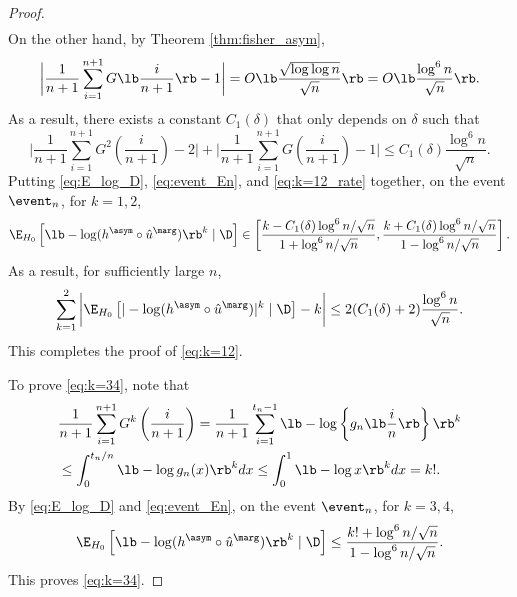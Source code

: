 \begin{proof}
\begin{align*}
    \end{align*}
  On the other hand, by Theorem \ref{thm:fisher_asym},
  \[\bigg|\frac{1}{n+1}\sum_{i=1}^{n+1} G\lb\frac{i}{n+1}\rb - 1\bigg| = O\lb \frac{\sqrt{\log\log n}}{\sqrt{n}}\rb =  O\lb \frac{\log^6 n}{\sqrt{n}}\rb.\]
  As a result, there exists a constant $C_1(\delta)$ that only depends on $\delta$ such that
  \begin{equation}
    \label{eq:k=12_rate}
    \bigg|\frac{1}{n+1}\sum_{i=1}^{n+1}G^2\left(\frac{i}{n+1}\right) - 2\bigg| + \bigg|\frac{1}{n+1}\sum_{i=1}^{n+1}G\left(\frac{i}{n+1}\right) - 1\bigg|\le C_1(\delta)\frac{\log^6 n}{\sqrt{n}}.
  \end{equation}
    Putting \eqref{eq:E_log_D}, \eqref{eq:event_En}, and \eqref{eq:k=12_rate} together, on the event $\event_{n}$, for $k = 1,2$,
    \[\E_{H_0}\left[\lb -\log (h^\asym \circ \hat{u}^\marg)\rb^{k}\mid \D\right]\in \left[\frac{k - C_1(\delta) \log^6 n / \sqrt{n}}{1 + \log^6 n / \sqrt{n}}, \frac{k + C_1(\delta) \log^6 n / \sqrt{n}}{1 - \log^6 n / \sqrt{n}}\right].\]
    As a result, for sufficiently large $n$,
  \[\sum_{k=1}^{2}\bigg|\E_{H_0}\left[|-\log (h^\asym \circ \hat{u}^\marg)|^k\mid \D\right] - k\bigg| \le 2(C_1(\delta) + 2)\frac{\log^6 n}{\sqrt{n}}.\]
  This completes the proof of \eqref{eq:k=12}.

  To prove \eqref{eq:k=34}, note that
  \begin{align*}
    &\frac{1}{n+1}\sum_{i=1}^{n+1}G^k\left(\frac{i}{n+1}\right) = \frac{1}{n+1}\sum_{i=1}^{t_n - 1} \lb -\log \left\{g_n\lb\frac{i}{n}\rb\right\}\rb^{k}\\
& \le \int_{0}^{t_n/n}\lb-\log g_n(x)\rb^k dx\le \int_{0}^{1}\lb-\log x\rb^k dx = k!.
  \end{align*}
  By \eqref{eq:E_log_D} and \eqref{eq:event_En}, on the event $\event_{n}$, for $k = 3,4$,
  \[\E_{H_0}\left[\lb -\log (h^\asym \circ \hat{u}^\marg)\rb^{k}\mid \D\right]\le \frac{k! + \log^6 n / \sqrt{n}}{1 - \log^6 n / \sqrt{n}}.\]
  This proves \eqref{eq:k=34}.
\end{proof}


